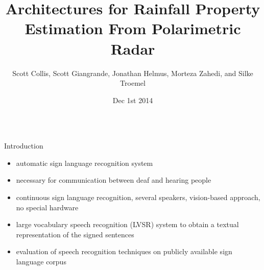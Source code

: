 \documentclass[final,t]{beamer}
\title{\huge Architectures for Rainfall Property Estimation From Polarimetric Radar}
\author[Collis et al.]{Scott Collis, Scott Giangrande, Jonathan Helmus, Morteza Zahedi, and Silke Troemel}
\institute[Argonne]{Argonne National Laboratory Argonne, ILUnited States }
\date[Dec. 1 , 2014]{Dec 1st 2014}
\begin{document}
\begin{frame}{} 
  \begin{columns}[t]
    \begin{column}{.3\linewidth}


      \begin{block}{Introduction}
        \begin{itemize}
        \item automatic sign language recognition system                                    %
        \item \alert{necessary for communication} between deaf and
          hearing people
        \item \alert{continuous} sign language recognition,
          \alert{several} speakers, \alert{vision-based} approach, \alert{no
            special hardware}
        \item large vocabulary speech recognition (LVSR) system to
          obtain a textual representation of the signed
          sentences 
        \item evaluation of speech recognition techniques on \alert{publicly
          available sign language
          corpus}
        \end{itemize}
      \end{block}

      

\end{column}
\end{columns}
\end{frame}
\end{document}
